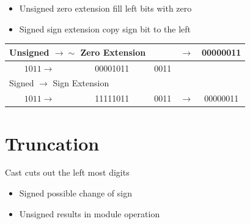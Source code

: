 \begin{itemize}
  \item Unsigned zero extension fill left bits with zero
  \item Signed sign extension copy sign bit to the left
\end{itemize}

\begin{center}
\begin{tabular}{|c|c|c|c|c|}
\hline
\multicolumn{2}{|l|}{Unsigned $\rightarrow \boldsymbol{\sim}$ Zero Extension} &  & \multirow[b]{2}{*}{$\rightarrow$} & \multirow[b]{2}{*}{00000011} \\
\hline
$1011 \rightarrow$ & 00001011 & 0011 &  &  \\
\hline
\multicolumn{5}{|l|}{Signed $\boldsymbol{\rightarrow}$ Sign Extension} \\
\hline
$1011 \rightarrow$ & 11111011 & 0011 & $\rightarrow$ & 00000011 \\
\hline
\end{tabular}
\end{center}

\section*{Truncation}
Cast cuts out the left most digits

\begin{itemize}
  \item Signed possible change of sign
  \item Unsigned results in module operation
\end{itemize}

